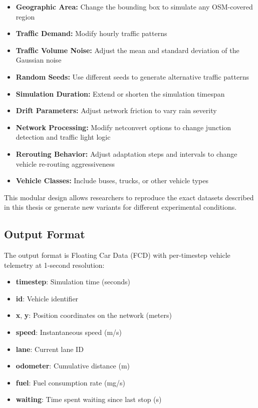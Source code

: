 \begin{itemize}
    \item \textbf{Geographic Area:} Change the bounding box to simulate any OSM-covered region
    \item \textbf{Traffic Demand:} Modify hourly traffic patterns
    \item \textbf{Traffic Volume Noise:} Adjust the mean and standard deviation of the Gaussian noise
    \item \textbf{Random Seeds:} Use different seeds to generate alternative traffic patterns
    \item \textbf{Simulation Duration:} Extend or shorten the simulation timespan
    \item \textbf{Drift Parameters:} Adjust network friction to vary rain severity
    \item \textbf{Network Processing:} Modify netconvert options to change junction detection and traffic light logic
    \item \textbf{Rerouting Behavior:} Adjust adaptation steps and intervals to change vehicle re-routing aggressiveness
    \item \textbf{Vehicle Classes:} Include buses, trucks, or other vehicle types
\end{itemize}

This modular design allows researchers to reproduce the exact datasets described in this thesis or generate new variants for different experimental conditions.

\subsection{Output Format}
The output format is Floating Car Data (FCD) with per-timestep vehicle telemetry at 1-second resolution:

\begin{itemize}
    \item \textbf{timestep}: Simulation time (seconds)
    \item \textbf{id}: Vehicle identifier
    \item \textbf{x}, \textbf{y}: Position coordinates on the network (meters)
    \item \textbf{speed}: Instantaneous speed (m/s)
    \item \textbf{lane}: Current lane ID
    \item \textbf{odometer}: Cumulative distance (m)
    \item \textbf{fuel}: Fuel consumption rate (mg/s)
    \item \textbf{waiting}: Time spent waiting since last stop (s)
\end{itemize}


